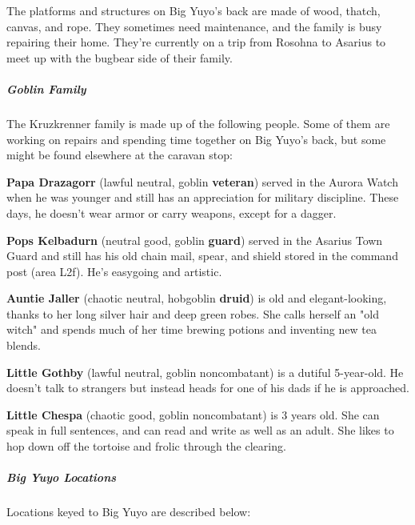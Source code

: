\documentclass[10pt,a4paper,twoside,fancy,bg=print,twocolumn,openany,nodeprecatedcode]{dndbook}
\begin{document}
The platforms and structures on Big Yuyo's back are made of wood, thatch, canvas, and rope. They sometimes need maintenance, and the family is busy repairing their home. They're currently on a trip from Rosohna to Asarius to meet up with the bugbear side of their family.

\subparagraph{Goblin Family}
The Kruzkrenner family is made up of the following people. Some of them are working on repairs and spending time together on Big Yuyo's back, but some might be found elsewhere at the caravan stop:

\textbf{Papa Drazagorr} (lawful neutral, goblin \textbf{veteran}) served in the Aurora Watch when he was younger and still has an appreciation for military discipline. These days, he doesn't wear armor or carry weapons, except for a dagger.

\textbf{Pops Kelbadurn} (neutral good, goblin \textbf{guard}) served in the Asarius Town Guard and still has his old chain mail, spear, and shield stored in the command post (area L2f). He's easygoing and artistic.

\textbf{Auntie Jaller} (chaotic neutral, hobgoblin \textbf{druid}) is old and elegant-looking, thanks to her long silver hair and deep green robes. She calls herself an "old witch" and spends much of her time brewing potions and inventing new tea blends.

\textbf{Little Gothby} (lawful neutral, goblin noncombatant) is a dutiful 5-year-old. He doesn't talk to strangers but instead heads for one of his dads if he is approached.

\textbf{Little Chespa} (chaotic good, goblin noncombatant) is 3 years old. She can speak in full sentences, and can read and write as well as an adult. She likes to hop down off the tortoise and frolic through the clearing.

\subparagraph{Big Yuyo Locations}
Locations keyed to Big Yuyo are described below:
\end{document}
